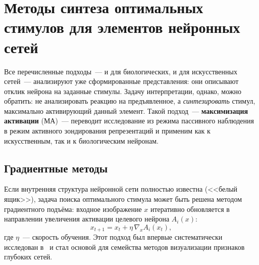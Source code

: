 
\section{Методы синтеза оптимальных стимулов для элементов нейронных сетей}\label{sec:lit_stimuli}


Все перечисленные подходы~--- и для биологических, и для искусственных сетей~--- анализируют уже сформированные представления: они описывают отклик нейрона на заданные стимулы. Задачу интерпретации, однако, можно обратить: не анализировать реакцию на предъявленное, а \textit{синтезировать} стимул, максимально активирующий данный элемент. Такой подход~--- \textbf{максимизация активации} (МА)~--- переводит исследование из режима пассивного наблюдения в режим активного зондирования репрезентаций и применим как к искусственным, так и к биологическим нейронам.

\subsection{Градиентные методы}\label{sec:gradient_am}

Если внутренняя структура нейронной сети полностью известна (<<белый ящик>>), задача поиска оптимального стимула может быть решена методом градиентного подъёма: входное изображение $x$ итеративно обновляется в направлении увеличения активации целевого нейрона $A_i(x)$:
\begin{equation}\label{eq:gradient_am}
    x_{t+1} = x_t + \eta\,\nabla_x A_i(x_t),
\end{equation}
где $\eta$~--- скорость обучения. Этот подход был впервые систематически исследован в~\cite{erhan2009visualizing} и стал основой для семейства методов визуализации признаков глубоких сетей.

